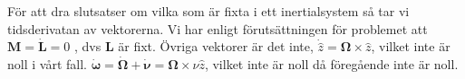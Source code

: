 \documentclass[12pt,a4paper]{article}
\begin{document}

 
För att dra slutsatser om vilka som är fixta i ett inertialsystem så tar vi tidsderivatan av vektorerna. Vi har enligt förutsättningen för problemet att $\mathbf{M} = \dot{\mathbf{L}}=0$ , dvs $\mathbf{L}$ är fixt. Övriga vektorer är det inte, $\dot{\hat{z}}=\boldsymbol{\Omega} \times \hat{z}$, vilket inte är noll i vårt fall. $\dot{\boldsymbol{\omega}} = \dot{\boldsymbol{\Omega}}+\dot{\boldsymbol{\nu}} = \boldsymbol{\Omega} \times \nu \hat{z}$, vilket inte är noll då föregående inte är noll.
\end{document}
